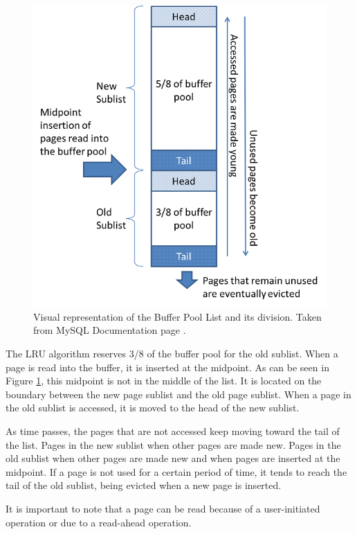 \documentclass[12pt]{article}
\begin{document}
\begin{figure}[htbp]
\centering
    \includegraphics[scale=0.4]{files/buffer_pool.png}
    \caption{Visual representation of the Buffer Pool List and its division. Taken from MySQL Documentation page \parencite{BUFFER_POOL}.}
    \label{buffer_pool}
\end{figure}

The LRU algorithm reserves 3/8 of the buffer pool for the old sublist. When a page is read into the buffer, it is inserted at the midpoint. As can be seen in Figure \ref{buffer_pool}, this midpoint is not in the middle of the list. It is located on the boundary between the new page sublist and the old page sublist. When a page in the old sublist is accessed, it is moved to the head of the new sublist. 

As time passes, the pages that are not accessed keep moving toward the tail of the list. Pages in the new sublist  when other pages are made new. Pages in the old sublist  when other pages are made new and when pages are inserted at the midpoint. If a page is not used for a certain period of time, it tends to reach the tail of the old sublist, being evicted when a new page is inserted.

It is important to note that a page can be read because of a user-initiated operation or due to a read-ahead operation.
\end{document}
